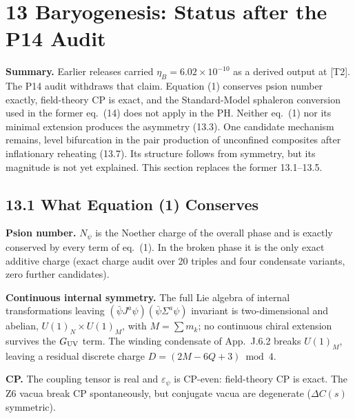 \section*{13  Baryogenesis: Status after the P14 Audit}

\noindent \textbf{Summary. }Earlier releases carried $\eta_B = 6.02\times10^{-10}$ as a derived output at [T2]. The P14 audit withdraws that claim. Equation (1) conserves psion number exactly, field-theory CP is exact, and the Standard-Model sphaleron conversion used in the former eq.~(14) does not apply in the PH. Neither eq.~(1) nor its minimal extension produces the asymmetry (13.3). One candidate mechanism remains, level bifurcation in the pair production of unconfined composites after inflationary reheating (13.7). Its structure follows from symmetry, but its magnitude is not yet explained. This section replaces the former 13.1--13.5.

\subsection*{13.1  What Equation (1) Conserves}

\noindent \textbf{Psion number. }$N_\psi$ is the Noether charge of the overall phase and is exactly conserved by every term of eq.~(1). In the broken phase it is the only exact additive charge (exact charge audit over 20 triples and four condensate variants, zero further candidates).

\noindent \textbf{Continuous internal symmetry. }The full Lie algebra of internal transformations leaving $(\bar\psi J^a\psi)(\bar\psi\Sigma^a\psi)$ invariant is two-dimensional and abelian, $U(1)_N\times U(1)_M$, with $M=\sum m_k$; no continuous chiral extension survives the $G_{\rm UV}$ term. The winding condensate of App.~J.6.2 breaks $U(1)_M$, leaving a residual discrete charge $D=(2M-6Q+3)\bmod 4$.

\noindent \textbf{CP. }The coupling tensor is real and $\varepsilon_\psi$ is CP-even: field-theory CP is exact. The Z6 vacua break CP spontaneously, but conjugate vacua are degenerate ($\Delta C(s)$ symmetric).

